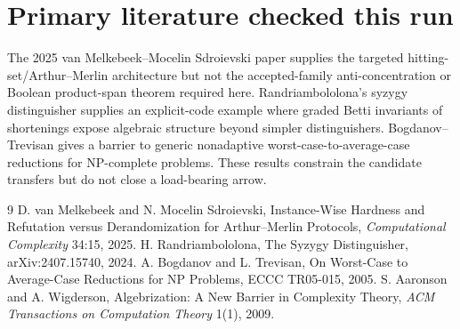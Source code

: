 \documentclass[11pt]{article}
\begin{document}
\section*{Primary literature checked this run}
The 2025 van Melkebeek--Mocelin Sdroievski paper supplies the targeted hitting-set/Arthur--Merlin architecture but not the accepted-family anti-concentration or Boolean product-span theorem required here. Randriambololona's syzygy distinguisher supplies an explicit-code example where graded Betti invariants of shortenings expose algebraic structure beyond simpler distinguishers. Bogdanov--Trevisan gives a barrier to generic nonadaptive worst-case-to-average-case reductions for NP-complete problems. These results constrain the candidate transfers but do not close a load-bearing arrow.

\begin{thebibliography}{9}
 D. van Melkebeek and N. Mocelin Sdroievski, Instance-Wise Hardness and Refutation versus Derandomization for Arthur--Merlin Protocols, \emph{Computational Complexity} 34:15, 2025.
 H. Randriambololona, The Syzygy Distinguisher, arXiv:2407.15740, 2024.
 A. Bogdanov and L. Trevisan, On Worst-Case to Average-Case Reductions for NP Problems, ECCC TR05-015, 2005.
 S. Aaronson and A. Wigderson, Algebrization: A New Barrier in Complexity Theory, \emph{ACM Transactions on Computation Theory} 1(1), 2009.
\end{thebibliography}
\end{document}
